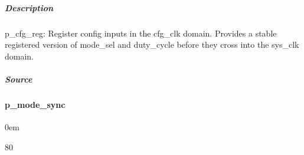 \documentclass[letterpaper,10pt,english]{sphinxmanual}
\begin{document}
\subparagraph{Description}
\label{\detokenize{modules/cfg_sync/processes/p_cfg_reg:description}}
\sphinxAtStartPar
p\_cfg\_reg: Register config inputs in the cfg\_clk domain.
Provides a stable registered version of mode\_sel and duty\_cycle
before they cross into the sys\_clk domain.


\subparagraph{Source}
\label{\detokenize{modules/cfg_sync/processes/p_cfg_reg:source}}
\begin{sphinxVerbatim}[commandchars=\\\{\}]
\end{sphinxVerbatim}

\sphinxstepscope


\paragraph{p\_mode\_sync}
\label{\detokenize{modules/cfg_sync/processes/p_mode_sync:p-mode-sync}}\label{\detokenize{modules/cfg_sync/processes/p_mode_sync::doc}}
\begin{DUlineblock}{0em}
\item[]  
\item[]  80
\item[]  
\item[]  
\end{DUlineblock}
\end{document}
